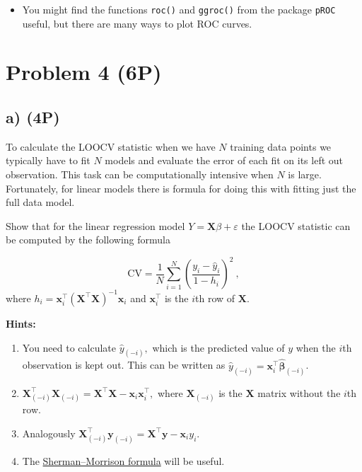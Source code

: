 \documentclass[
]{article}
\providecommand{\tightlist}{%
  \setlength{\itemsep}{0pt}\setlength{\parskip}{0pt}}
\begin{document}
\begin{itemize}
\tightlist
\item
  You might find the functions \texttt{roc()} and \texttt{ggroc()} from
  the package \texttt{pROC} useful, but there are many ways to plot ROC
  curves.
\end{itemize}

\hypertarget{problem-4-6p}{%
\section{Problem 4 (6P)}\label{problem-4-6p}}

\hypertarget{a-4p}{%
\subsection{a) (4P)}\label{a-4p}}

To calculate the LOOCV statistic when we have \(N\) training data points
we typically have to fit \(N\) models and evaluate the error of each fit
on its left out observation. This task can be computationally intensive
when \(N\) is large. Fortunately, for linear models there is formula for
doing this with fitting just the full data model.

Show that for the linear regression model
\(Y = \mathbf{X} \beta + \varepsilon\) the LOOCV statistic can be
computed by the following formula

\[
\text{CV} = \frac{1}{N} \sum_{i=1}^N \left( \frac{y_i - \hat{y}_i}{1 - h_{i}} \right)^2\ ,
\] where
\(h_i = \mathbf{x}_i^\top \left( \mathbf{X}^\top \mathbf{X} \right)^{-1} \mathbf{x}_i\)
and \(\mathbf{x}_i^\top\) is the \(i\)th row of \(\mathbf{X}\).

\textbf{Hints:}

\begin{enumerate}
\def\labelenumi{\arabic{enumi}.}
\item
  You need to calculate \(\hat{y}_{(-i)},\) which is the predicted value
  of \(y\) when the \(i\)th observation is kept out. This can be written
  as
  \(\hat y_{(-i)} = \mathbf{x}_i^\top \hat{\boldsymbol{\beta}}_{(-i)}\).
\item
  \(\mathbf{X}_{(-i)}^\top \mathbf{X}_{(-i)} = \mathbf{X}^\top \mathbf{X} - \mathbf{x}_i\mathbf{x}_i^\top,\)
  where \(\mathbf{X}_{(-i)}\) is the \(\mathbf{X}\) matrix without the
  \(i\)th row.
\item
  Analogously
  \(\mathbf{X}_{(-i)}^\top \mathbf{y}_{(-i)} = \mathbf{X}^\top \mathbf{y}-\mathbf{x}_i y_i\).
\item
  The
  \href{https://en.wikipedia.org/wiki/Sherman\%E2\%80\%93Morrison_formula}{Sherman--Morrison
  formula} will be useful.
\end{enumerate}
\end{document}

